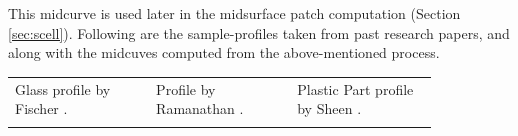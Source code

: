 \bigskip

This midcurve is used later in the midsurface patch computation (Section \ref{sec:scell}). Following are the sample-profiles taken from past research papers, and along with the midcuves computed from the above-mentioned process.

\bigskip

\begin{tabular}[h]{@{}p{0.28\linewidth} p{0.28\linewidth} p{0.28\linewidth}@{}}
Glass profile by Fischer \cite{Elber1999}. &
Profile by Ramanathan \cite{Ramanathan2004}. &
Plastic Part profile by Sheen \cite{Sheen2010}. \\ \\


\end{tabular}
